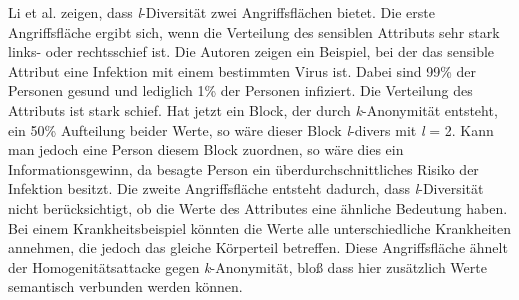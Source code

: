 Li et al. \cite{P-25} zeigen, dass \textit{l}-Diversität zwei Angriffsflächen bietet.
Die erste Angriffsfläche ergibt sich, wenn die Verteilung des sensiblen Attributs sehr stark links- oder rechtsschief ist.
Die Autoren zeigen ein Beispiel, bei der das sensible Attribut eine Infektion mit einem bestimmten Virus ist.
Dabei sind 99\% der Personen gesund und lediglich 1\% der Personen infiziert. 
Die Verteilung des Attributs ist stark schief. 
Hat jetzt ein Block, der durch \textit{k}-Anonymität entsteht, ein 50\% Aufteilung beider Werte, so wäre dieser Block \textit{l}-divers mit \textit{l} = 2. 
Kann man jedoch eine Person diesem Block zuordnen, so wäre dies ein Informationsgewinn, da besagte Person ein überdurchschnittliches Risiko der Infektion besitzt.
Die zweite Angriffsfläche entsteht dadurch, dass \textit{l}-Diversität nicht berücksichtigt, ob die Werte des Attributes eine ähnliche Bedeutung haben.
Bei einem Krankheitsbeispiel könnten die Werte alle unterschiedliche Krankheiten annehmen, die jedoch das gleiche Körperteil betreffen.
Diese Angriffsfläche ähnelt der Homogenitätsattacke gegen \textit{k}-Anonymität, bloß dass hier zusätzlich Werte semantisch verbunden werden können.

